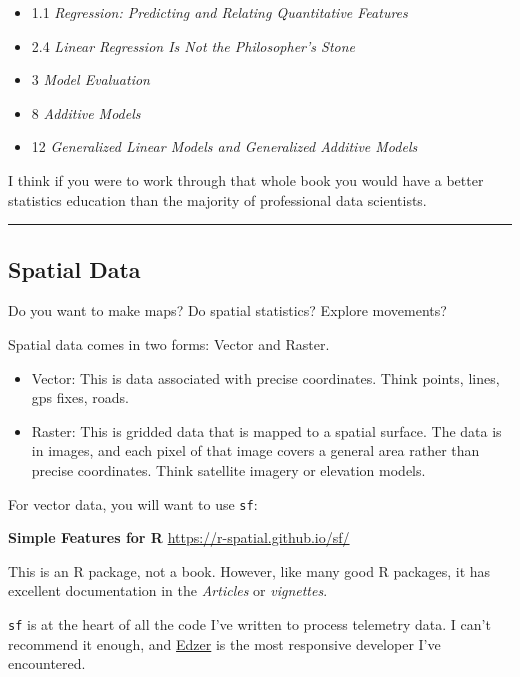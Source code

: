 \documentclass[
]{article}
\providecommand{\tightlist}{%
  \setlength{\itemsep}{0pt}\setlength{\parskip}{0pt}}
\begin{document}
\begin{itemize}
\tightlist
\item
  1.1 \emph{Regression: Predicting and Relating Quantitative Features}
\item
  2.4 \emph{Linear Regression Is Not the Philosopher's Stone}
\item
  3 \emph{Model Evaluation}
\item
  8 \emph{Additive Models}
\item
  12 \emph{Generalized Linear Models and Generalized Additive Models}
\end{itemize}

I think if you were to work through that whole book you would have a
better statistics education than the majority of professional data
scientists.

\begin{center}\rule{0.5\linewidth}{0.5pt}\end{center}

\hypertarget{spatial-data}{%
\subsection{Spatial Data}\label{spatial-data}}

Do you want to make maps? Do spatial statistics? Explore movements?

Spatial data comes in two forms: Vector and Raster.

\begin{itemize}
\tightlist
\item
  Vector: This is data associated with precise coordinates. Think
  points, lines, gps fixes, roads.
\item
  Raster: This is gridded data that is mapped to a spatial surface. The
  data is in images, and each pixel of that image covers a general area
  rather than precise coordinates. Think satellite imagery or elevation
  models.
\end{itemize}

For vector data, you will want to use \texttt{sf}:

\textbf{Simple Features for R} \url{https://r-spatial.github.io/sf/}

This is an R package, not a book. However, like many good R packages, it
has excellent documentation in the \emph{Articles} or \emph{vignettes}.

\texttt{sf} is at the heart of all the code I've written to process
telemetry data. I can't recommend it enough, and
\href{https://github.com/edzer}{Edzer} is the most responsive developer
I've encountered.
\end{document}
